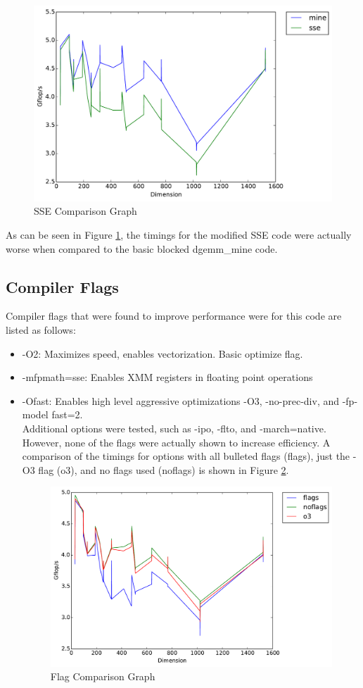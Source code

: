 \documentclass[letterpaper]{article}	 %
\begin{document}
\begin{figure}[H]
  \centering
  \includegraphics[width=.6\linewidth]{timing_sse.pdf}
  \caption{SSE Comparison Graph}
  \label{fig:sse}
\end{figure}
  
  As can be seen in Figure \ref{fig:sse}, the timings for the modified SSE code were actually worse when compared to the basic blocked dgemm\_mine code. 


\subsection{Compiler Flags}
Compiler flags that were found to improve performance were for this code are listed as follows: \\
\begin{itemize}
\item -O2: Maximizes speed, enables vectorization. Basic optimize flag. 
\item -mfpmath=sse: Enables XMM registers in floating point operations
\item -Ofast: Enables high level aggressive optimizations -O3, -no-prec-div, and -fp-model fast=2. 
\\ 

Additional options were tested, such as -ipo, -flto, and -march=native. However, none of the flags were actually shown to increase efficiency. A comparison of the timings for options with all bulleted flags (flags), just the -O3 flag (o3), and no flags used (noflags) is shown in Figure \ref{fig:flags}. 

\begin{figure}[H]
\centering
  \centering
  \includegraphics[width=.6\linewidth]{timing_flagcompare.pdf}
  \caption{Flag Comparison Graph}
  \label{fig:flags}
  \end{figure}

\end{itemize}
\end{document}
